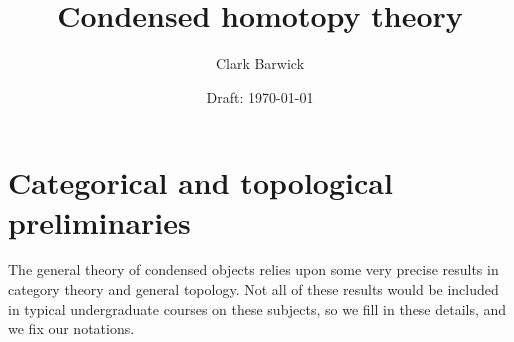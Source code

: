 \documentclass{cambridge7A}
\begin{document}

\author{Clark Barwick}
\title{Condensed homotopy theory}
\date{Draft: \today}
\subtitle{}
\maketitle

\frontmatter

%
%
%
%

\tableofcontents

%

\mainmatter


\part{Categorical and topological preliminaries}%
\label{prt:topological_preliminaries}

\noindent The general theory of condensed objects relies upon
some very precise results in category theory and general topology.
Not all of these results would be included in
typical undergraduate courses on these subjects,
so we fill in these details,
and we fix our notations.
\end{document}
